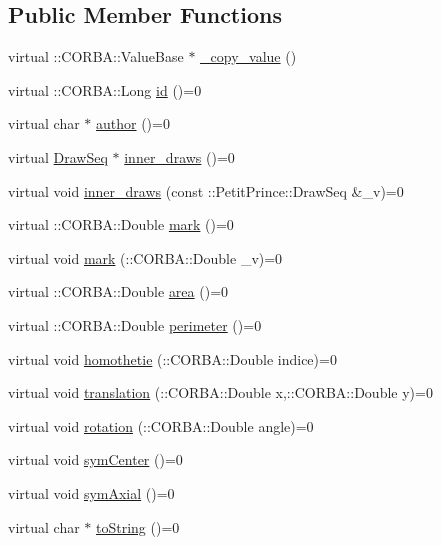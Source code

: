 \subsection*{Public Member Functions}
\begin{DoxyCompactItemize}
\item 
virtual \+::C\+O\+R\+B\+A\+::\+Value\+Base $\ast$ \hyperlink{class_draw_a833b3c7cd298f64e57e2d91644c1fba0}{\+\_\+copy\+\_\+value} ()
\item 
virtual \+::C\+O\+R\+B\+A\+::\+Long \hyperlink{class_draw_a50509da989141b00a5ae22d68a4d5856}{id} ()=0
\item 
virtual char $\ast$ \hyperlink{class_draw_a4a1145eee8c06df2d81c99ad3ed40237}{author} ()=0
\item 
virtual \hyperlink{class_draw_seq}{Draw\+Seq} $\ast$ \hyperlink{class_draw_a8dfc05b32e3879efeb3b497abed032e8}{inner\+\_\+draws} ()=0
\item 
virtual void \hyperlink{class_draw_ae1c94fbdfc84aed1996ef1cdb9495076}{inner\+\_\+draws} (const \+::Petit\+Prince\+::\+Draw\+Seq \&\+\_\+v)=0
\item 
virtual \+::C\+O\+R\+B\+A\+::\+Double \hyperlink{class_draw_a24995593a9bf2ae75e2bfd9360064fa8}{mark} ()=0
\item 
virtual void \hyperlink{class_draw_aa4e3152cacbeda31c43d1fab6f54f4f2}{mark} (\+::C\+O\+R\+B\+A\+::\+Double \+\_\+v)=0
\item 
virtual \+::C\+O\+R\+B\+A\+::\+Double \hyperlink{class_draw_a0fb84e185ec13237aa456962d1eb0816}{area} ()=0
\item 
virtual \+::C\+O\+R\+B\+A\+::\+Double \hyperlink{class_draw_a7171f2b64135c81a41cb5a7a9926af52}{perimeter} ()=0
\item 
virtual void \hyperlink{class_draw_a39387bf248da4d7d91bee9099d4b6fca}{homothetie} (\+::C\+O\+R\+B\+A\+::\+Double indice)=0
\item 
virtual void \hyperlink{class_draw_a71e63b40c9505098652a94e06872fdc6}{translation} (\+::C\+O\+R\+B\+A\+::\+Double x,\+::C\+O\+R\+B\+A\+::\+Double y)=0
\item 
virtual void \hyperlink{class_draw_ab45c311ee0963a1a5e3ba3ac461e467c}{rotation} (\+::C\+O\+R\+B\+A\+::\+Double angle)=0
\item 
virtual void \hyperlink{class_draw_a1a10bbbeb1ccd4b10b04226f3fe10755}{sym\+Center} ()=0
\item 
virtual void \hyperlink{class_draw_aede358197311244da0fe937fb7e9573e}{sym\+Axial} ()=0
\item 
virtual char $\ast$ \hyperlink{class_draw_a0dd9c8b5127149b28e54bd602c797cca}{to\+String} ()=0

\end{DoxyCompactItemize}
